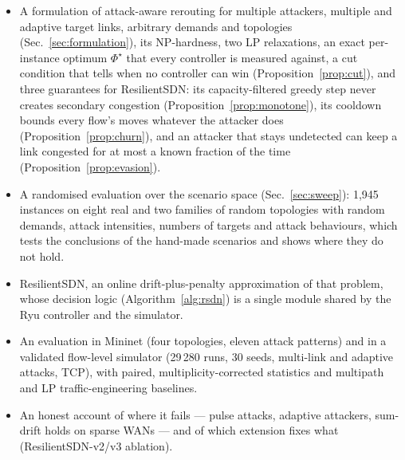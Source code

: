 \begin{itemize}
\item A formulation of attack-aware rerouting for multiple attackers, multiple and adaptive target
  links, arbitrary demands and topologies (Sec.~\ref{sec:formulation}), its NP-hardness, two LP
  relaxations, an exact per-instance optimum $\Phi^\star$ that every controller is measured against,
  a cut condition that tells when no controller can win (Proposition~\ref{prop:cut}), and three
  guarantees for ResilientSDN: its capacity-filtered greedy step never creates
  secondary congestion (Proposition~\ref{prop:monotone}), its cooldown bounds every flow's moves
  whatever the attacker does (Proposition~\ref{prop:churn}), and an attacker that stays undetected can
  keep a link congested for at most a known fraction of the time (Proposition~\ref{prop:evasion}).
\item A randomised evaluation over the scenario space (Sec.~\ref{sec:sweep}): 1{,}945 instances on
  eight real and two families of random topologies with random demands, attack intensities, numbers
  of targets and attack behaviours, which tests the conclusions of the hand-made scenarios and shows
  where they do not hold.
\item ResilientSDN, an online drift-plus-penalty approximation of that problem, whose decision logic
  (Algorithm~\ref{alg:rsdn}) is a single module shared by the Ryu controller and the simulator.
\item An evaluation in Mininet (four topologies, eleven attack patterns) and in a validated flow-level
  simulator (29\,280 runs, 30 seeds, multi-link and adaptive attacks, TCP), with paired,
  multiplicity-corrected statistics and multipath and LP traffic-engineering baselines.
\item An honest account of where it fails --- pulse attacks, adaptive attackers, sum-drift holds on
  sparse WANs --- and of which extension fixes what (ResilientSDN-v2/v3 ablation).
\end{itemize}

